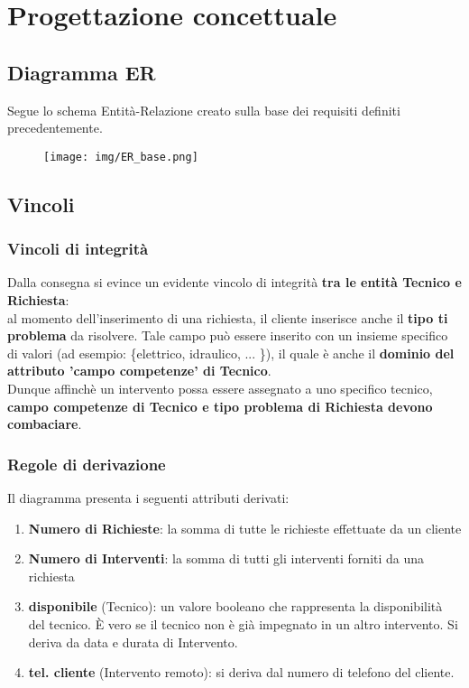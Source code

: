 \documentclass{article}
\begin{document}
\section{Progettazione concettuale}

\subsection{Diagramma ER}
Segue lo schema Entità-Relazione creato sulla base dei requisiti definiti precedentemente.

\begin{figure}[h]
    \centering
    \texttt{[image: img/ER\_base.png]}
    \label{fig:ER_Schema}
\end{figure}

\subsection{Vincoli}
    \subsubsection{Vincoli di integrità}
    Dalla consegna si evince un evidente vincolo di integrità \textbf{tra le entità Tecnico e Richiesta}: \\ al momento dell'inserimento di una richiesta, il cliente inserisce anche il \textbf{tipo ti problema} da risolvere. Tale campo può essere inserito con un insieme specifico di valori (ad esempio: \{elettrico, idraulico, ... \}), il quale è anche il \textbf{dominio del attributo 'campo competenze' di Tecnico}. \\ Dunque affinchè un intervento possa essere assegnato a uno specifico tecnico, \textbf{campo competenze di Tecnico e tipo problema di Richiesta devono combaciare}.
    
    \subsubsection{Regole di derivazione}
    
    Il diagramma presenta i seguenti attributi derivati:
    \begin{enumerate}
        \item \textbf{Numero di Richieste}: la somma di tutte le richieste effettuate da un cliente
        \item \textbf{Numero di Interventi}: la somma di tutti gli interventi forniti da una richiesta
        \item \textbf{disponibile} (Tecnico): un valore booleano che rappresenta la disponibilità del tecnico. È vero se il tecnico non è già impegnato in un altro intervento. Si deriva da data e durata di Intervento.
        \item \textbf{tel. cliente} (Intervento remoto): si deriva dal numero di telefono del cliente.
    \end{enumerate}
\end{document}
